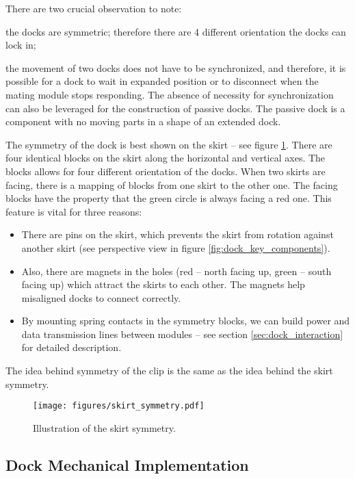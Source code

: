 There are two crucial observation to note:
\begin{enumerate*}
    \item the docks are symmetric; therefore there are 4 different orientation
    the docks can lock in;
    \item the movement of two docks does not have to be synchronized, and
    therefore, it is possible for a dock to wait in expanded position or to
    disconnect when the mating module stops responding. The absence of necessity
    for synchronization can also be leveraged for the construction of passive
    docks. The passive dock is a component with no moving parts in a shape of
    an extended dock.
\end{enumerate*}

The symmetry of the dock is best shown on the skirt -- see figure
\ref{fig:dock_skirt_symmetry}. There are four identical blocks on the skirt
along the horizontal and vertical axes. The blocks allows for four different
orientation of the docks. When two skirts are facing, there is a mapping of
blocks from one skirt to the other one. The facing blocks have the property that
the green circle is always facing a red one. This feature is vital for
three reasons:
\begin{itemize}
    \item There are pins on the skirt, which prevents the skirt from
    rotation against another skirt (see perspective view in figure
    \ref{fig:dock_key_components}).
    \item Also, there are magnets in the holes (red -- north facing up, green --
    south facing up) which attract the skirts to each other. The magnets help
    misaligned docks to connect correctly.
    \item By mounting spring contacts in the symmetry blocks, we can build power
    and data transmission lines between modules -- see section
    \ref{sec:dock_interaction} for detailed description.
\end{itemize}
The idea behind symmetry of the clip is the same as the idea behind the skirt
symmetry.

\begin{figure}[!ht]
    \centering
    \texttt{[image: figures/skirt\_symmetry.pdf]}
    \caption{Illustration of the skirt symmetry.}
    \label{fig:dock_skirt_symmetry}
\end{figure}

\subsection{Dock Mechanical Implementation}


